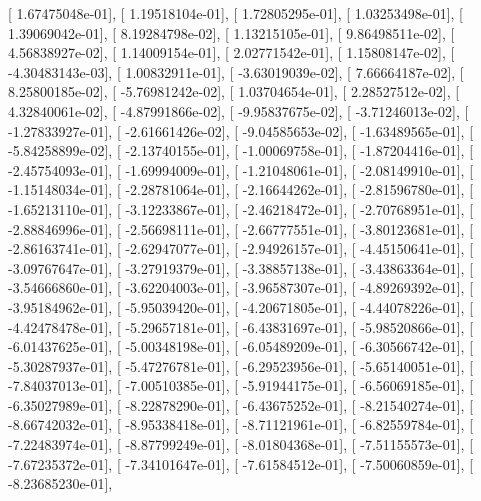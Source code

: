 \documentclass{article}
\begin{document}
       [  1.67475048e-01],
       [  1.19518104e-01],
       [  1.72805295e-01],
       [  1.03253498e-01],
       [  1.39069042e-01],
       [  8.19284798e-02],
       [  1.13215105e-01],
       [  9.86498511e-02],
       [  4.56838927e-02],
       [  1.14009154e-01],
       [  2.02771542e-01],
       [  1.15808147e-02],
       [ -4.30483143e-03],
       [  1.00832911e-01],
       [ -3.63019039e-02],
       [  7.66664187e-02],
       [  8.25800185e-02],
       [ -5.76981242e-02],
       [  1.03704654e-01],
       [  2.28527512e-02],
       [  4.32840061e-02],
       [ -4.87991866e-02],
       [ -9.95837675e-02],
       [ -3.71246013e-02],
       [ -1.27833927e-01],
       [ -2.61661426e-02],
       [ -9.04585653e-02],
       [ -1.63489565e-01],
       [ -5.84258899e-02],
       [ -2.13740155e-01],
       [ -1.00069758e-01],
       [ -1.87204416e-01],
       [ -2.45754093e-01],
       [ -1.69994009e-01],
       [ -1.21048061e-01],
       [ -2.08149910e-01],
       [ -1.15148034e-01],
       [ -2.28781064e-01],
       [ -2.16644262e-01],
       [ -2.81596780e-01],
       [ -1.65213110e-01],
       [ -3.12233867e-01],
       [ -2.46218472e-01],
       [ -2.70768951e-01],
       [ -2.88846996e-01],
       [ -2.56698111e-01],
       [ -2.66777551e-01],
       [ -3.80123681e-01],
       [ -2.86163741e-01],
       [ -2.62947077e-01],
       [ -2.94926157e-01],
       [ -4.45150641e-01],
       [ -3.09767647e-01],
       [ -3.27919379e-01],
       [ -3.38857138e-01],
       [ -3.43863364e-01],
       [ -3.54666860e-01],
       [ -3.62204003e-01],
       [ -3.96587307e-01],
       [ -4.89269392e-01],
       [ -3.95184962e-01],
       [ -5.95039420e-01],
       [ -4.20671805e-01],
       [ -4.44078226e-01],
       [ -4.42478478e-01],
       [ -5.29657181e-01],
       [ -6.43831697e-01],
       [ -5.98520866e-01],
       [ -6.01437625e-01],
       [ -5.00348198e-01],
       [ -6.05489209e-01],
       [ -6.30566742e-01],
       [ -5.30287937e-01],
       [ -5.47276781e-01],
       [ -6.29523956e-01],
       [ -5.65140051e-01],
       [ -7.84037013e-01],
       [ -7.00510385e-01],
       [ -5.91944175e-01],
       [ -6.56069185e-01],
       [ -6.35027989e-01],
       [ -8.22878290e-01],
       [ -6.43675252e-01],
       [ -8.21540274e-01],
       [ -8.66742032e-01],
       [ -8.95338418e-01],
       [ -8.71121961e-01],
       [ -6.82559784e-01],
       [ -7.22483974e-01],
       [ -8.87799249e-01],
       [ -8.01804368e-01],
       [ -7.51155573e-01],
       [ -7.67235372e-01],
       [ -7.34101647e-01],
       [ -7.61584512e-01],
       [ -7.50060859e-01],
       [ -8.23685230e-01],
\end{document}
